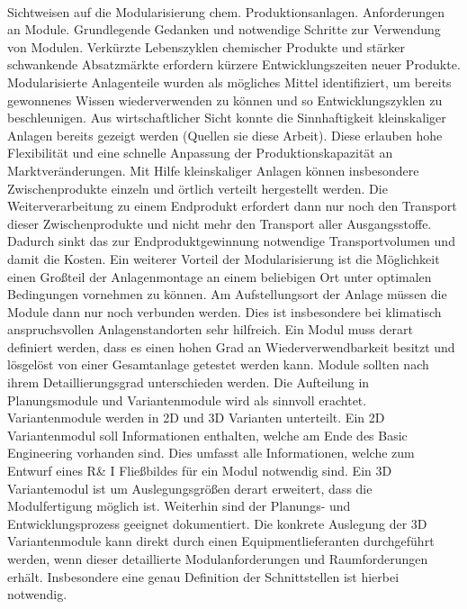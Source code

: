 \paragraph*{\cite{Bramsiepe_2012}} Sichtweisen auf die Modularisierung chem. Produktionsanlagen. Anforderungen an Module. Grundlegende Gedanken und notwendige Schritte zur Verwendung von Modulen. \hfill \newline
Verk\"urzte Lebenszyklen chemischer Produkte und st\"arker schwankende Absatzm\"arkte erfordern k\"urzere Entwicklungszeiten neuer Produkte. Modularisierte Anlagenteile wurden als m\"ogliches Mittel identifiziert, um bereits gewonnenes Wissen wiederverwenden zu k\"onnen und so Entwicklungszyklen zu beschleunigen. Aus wirtschaftlicher Sicht konnte die Sinnhaftigkeit kleinskaliger Anlagen bereits gezeigt werden (Quellen sie diese Arbeit). Diese erlauben hohe Flexibilit\"at und eine schnelle Anpassung der Produktionskapazit\"at an Marktver\"anderungen. Mit Hilfe kleinskaliger Anlagen k\"onnen insbesondere Zwischenprodukte einzeln und \"ortlich verteilt hergestellt werden. Die Weiterverarbeitung zu einem Endprodukt erfordert dann nur noch den Transport dieser Zwischenprodukte und nicht mehr den Transport aller Ausgangsstoffe. Dadurch sinkt das zur Endproduktgewinnung notwendige Transportvolumen und damit die Kosten. Ein weiterer Vorteil der Modularisierung ist die M\"oglichkeit einen Gro\ss{}teil der Anlagenmontage an einem beliebigen Ort unter optimalen Bedingungen vornehmen zu k\"onnen. Am Aufstellungsort der Anlage m\"ussen die Module dann nur noch verbunden werden. Dies ist insbesondere bei klimatisch anspruchsvollen Anlagenstandorten sehr hilfreich. Ein Modul muss derart definiert werden, dass es einen hohen Grad an Wiederverwendbarkeit besitzt und l\"osgel\"ost von einer Gesamtanlage getestet werden kann. Module sollten nach ihrem Detaillierungsgrad unterschieden werden. Die Aufteilung in Planungsmodule und Variantenmodule wird als sinnvoll erachtet. Variantenmodule werden in 2D und 3D Varianten unterteilt. Ein 2D Variantenmodul soll Informationen enthalten, welche am Ende des Basic Engineering vorhanden sind. Dies umfasst alle Informationen, welche zum Entwurf eines R\& I Flie\ss{}bildes f\"ur ein Modul notwendig sind. Ein 3D Variantemodul ist um Auslegungsgr\"o\ss{}en derart erweitert, dass die Modulfertigung m\"oglich ist. Weiterhin sind der Planungs- und Entwicklungsprozess geeignet dokumentiert. Die konkrete Auslegung der 3D Variantenmodule kann direkt durch einen Equipmentlieferanten durchgef\"uhrt werden, wenn dieser detaillierte Modulanforderungen und Raumforderungen erh\"alt. Insbesondere eine genau Definition der Schnittstellen ist hierbei notwendig.  
